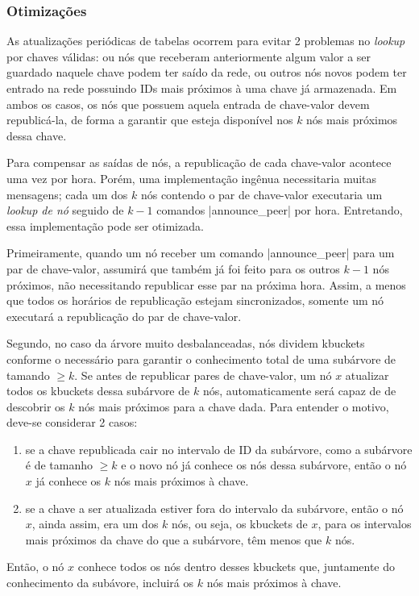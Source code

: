 
\subsubsection*{Otimizações}

As atualizações periódicas de tabelas ocorrem para evitar 2 problemas no \emph{lookup}
por chaves válidas: ou nós que receberam anteriormente algum valor a ser guardado
naquele chave podem ter saído da rede, ou outros nós novos podem ter entrado na rede
possuindo IDs mais próximos à uma chave já armazenada. Em ambos os casos, os nós que
possuem aquela entrada de chave-valor devem republicá-la, de forma a garantir que esteja
disponível nos $k$ nós mais próximos dessa chave.

Para compensar as saídas de nós, a republicação de cada chave-valor acontece uma vez por
hora. Porém, uma implementação ingênua necessitaria muitas mensagens; cada um dos $k$
nós contendo o par de chave-valor executaria um \emph{lookup de nó} seguido de $k - 1$
comandos \bverb|announce_peer| por hora. Entretando, essa implementação pode ser
otimizada.

Primeiramente, quando um nó receber um comando \bverb|announce_peer| para um par de
chave-valor, assumirá que também já foi feito para os outros $k - 1$ nós próximos, não
necessitando republicar esse par na próxima hora. Assim, a menos que todos os horários
de republicação estejam sincronizados, somente um nó executará a republicação do par de
chave-valor.

Segundo, no caso da árvore muito desbalanceadas, nós dividem \glspl*{kbucket} conforme
o necessário para garantir o conhecimento total de uma subárvore de tamando $\geq k$. Se
antes de republicar pares de chave-valor, um nó $x$ atualizar todos os \glspl*{kbucket}
dessa subárvore de $k$ nós, automaticamente será capaz de de descobrir os $k$ nós
mais próximos para a chave dada. Para entender o motivo, deve-se considerar 2 casos:

\begin{enumerate}
    \item se a chave republicada cair no intervalo de ID da subárvore, como a subárvore
        é de tamanho $\geq k$ e o novo nó já conhece os nós dessa subárvore, então o nó
        $x$ já conhece os $k$ nós mais próximos à chave.

    \item se a chave a ser atualizada estiver fora do intervalo da subárvore, então o
        nó $x$, ainda assim, era um dos $k$ nós, ou seja, os \glspl*{kbucket} de $x$,
        para os intervalos mais próximos da chave do que a subárvore, têm menos que $k$
        nós.
\end{enumerate}

Então, o nó $x$ conhece todos os nós dentro desses \glspl*{kbucket} que, juntamente do
conhecimento da subávore, incluirá os $k$ nós mais próximos à chave.